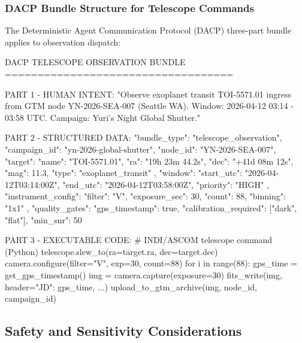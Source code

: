 \documentclass[11pt,letterpaper]{article}
\begin{document}
\subsubsection{DACP Bundle Structure for Telescope Commands}

The Deterministic Agent Communication Protocol (DACP) three-part bundle applies to observation dispatch:

\begin{asciibox}
DACP TELESCOPE OBSERVATION BUNDLE
===================================

PART 1 - HUMAN INTENT:
  "Observe exoplanet transit TOI-5571.01 ingress
   from GTM node YN-2026-SEA-007 (Seattle WA).
   Window: 2026-04-12 03:14 - 03:58 UTC.
   Campaign: Yuri's Night Global Shutter."

PART 2 - STRUCTURED DATA:
  {
    "bundle_type": "telescope_observation",
    "campaign_id": "yn-2026-global-shutter",
    "node_id": "YN-2026-SEA-007",
    "target": {
      "name": "TOI-5571.01",
      "ra": "19h 23m 44.2s",
      "dec": "+41d 08m 12s",
      "mag": 11.3,
      "type": "exoplanet_transit"
    },
    "window": {
      "start_utc": "2026-04-12T03:14:00Z",
      "end_utc": "2026-04-12T03:58:00Z",
      "priority": "HIGH"
    },
    "instrument_config": {
      "filter": "V",
      "exposure_sec": 30,
      "count": 88,
      "binning": "1x1"
    },
    "quality_gates": {
      "gps_timestamp": true,
      "calibration_required": ["dark", "flat"],
      "min_snr": 50
    }
  }

PART 3 - EXECUTABLE CODE:
  # INDI/ASCOM telescope command (Python)
  telescope.slew_to(ra=target.ra, dec=target.dec)
  camera.configure(filter="V", exp=30, count=88)
  for i in range(88):
      gps_time = get_gps_timestamp()
      img = camera.capture(exposure=30)
      fits_write(img, header={"JD": gps_time, ...})
      upload_to_gtm_archive(img, node_id, campaign_id)
\end{asciibox}

\subsection{Safety and Sensitivity Considerations}
\end{document}
